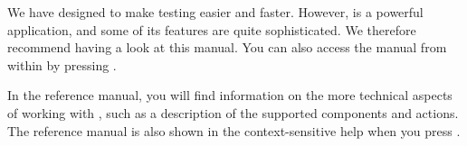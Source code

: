 We have designed \app{} to make testing easier and faster. However,  \app{} is a powerful application, and some of its features are quite sophisticated. We therefore recommend having a look at this manual. You can also access the manual from within \app{} by pressing .  

In the reference manual, you will find information on the more technical aspects of working with \app{}, such as a description of the supported components and actions. The reference manual is also shown in the context-sensitive help when you press . 



